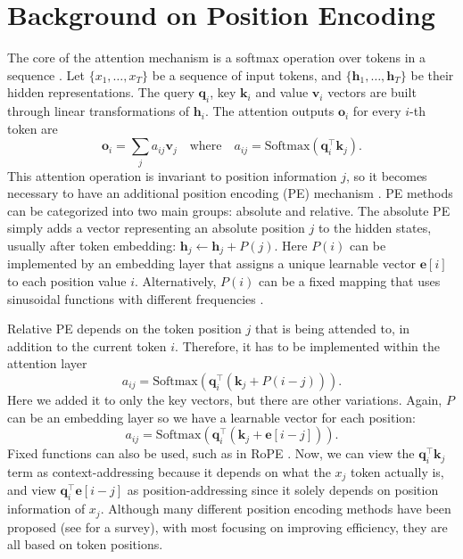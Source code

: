 \documentclass{article}
\renewcommand{\vec}{\mathbf}
\begin{document}



\section{Background on Position Encoding}
The core of the attention mechanism is a softmax operation over tokens in a sequence \citep{Bahdanau2014NeuralMT}. 
Let $\{x_1, \ldots, x_T\}$ be a sequence of input tokens, and $\{\vec{h}_1, \ldots, \vec{h}_T\}$ be their hidden representations.
The query $\vec{q}_i$, key $\vec{k}_i$ and value $\vec{v}_i$ vectors are built through linear transformations of $\vec{h}_i$.
The attention outputs $\vec{o}_i$ for every $i$-th token are
\[
\vec{o}_i = \sum_j a_{ij} \vec{v}_j \quad \text{where} \quad
a_{ij} = \text{Softmax}(\vec{q}_i^\top \vec{k}_j) .
\]
This attention operation is invariant to position information $j$, so it becomes necessary to have an additional position  encoding (PE) mechanism \citep{Sukhbaatar2015EndToEndMN}.
PE methods can be categorized into two main groups: absolute and relative.
The absolute PE simply adds a vector representing an absolute position $j$ to the hidden states, usually after token embedding:
$\vec{h}_j \leftarrow \vec{h}_j + P(j) $.
Here $P(i)$ can be implemented by an embedding layer that assigns a unique learnable vector $\vec{e}[i]$ to each position value $i$.
Alternatively, $P(i)$ can be a fixed mapping that uses sinusoidal functions with different frequencies \citep{vaswani2017attention}.

Relative PE \citep{shaw2018self} depends on the token position $j$ that is being attended to, in addition to the current token $i$.
Therefore, it has to be implemented within the attention layer
\[
a_{ij} = \text{Softmax}(\vec{q}_i^\top (\vec{k}_j + P(i - j))) .
\]
Here we added it to only the key vectors, but there are  other variations.
Again, $P$ can be an embedding layer so we have a learnable vector for each position:
\begin{equation}
\label{eq:rel_attn}    
a_{ij} = \text{Softmax}(\vec{q}_i^\top (\vec{k}_j + \vec{e}[i - j])) .
\end{equation}
Fixed functions can also be used, such as in RoPE \citep{su2024roformer}.
Now, we can view the $\vec{q}_i^\top \vec{k}_j$ term as context-addressing because it depends on what the $x_j$ token actually is, and view $\vec{q}_i^\top \vec{e}[i - j]$ as position-addressing since it solely depends on position information of $x_j$.
Although many different position encoding methods have been proposed (see \citet{dufter2022position} for a survey), with most focusing on improving efficiency, they are all based on token positions.
\end{document}
